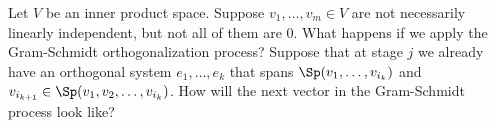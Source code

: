 \begin{exercise}
Let $V$ be an inner product space. Suppose $v_1, \dots, v_m \in V$ are not necessarily linearly independent, but not all of them are $0$. What happens if we apply the Gram-Schmidt orthogonalization process?
Suppose that at stage $j$ we already have an orthogonal system $e_1, \dots, e_k$ that spans $\Sp(v_1, \dots, v_{i_k})$ and $v_{i_{k+1}} \in \Sp(v_1, v_2, \dots, v_{i_k})$. How will the next vector in the Gram-Schmidt process look like?
\end{exercise}
